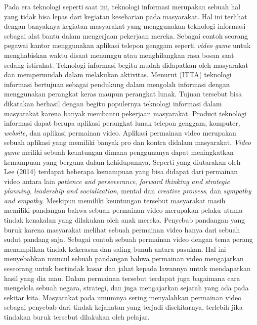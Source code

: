 Pada era teknologi seperti saat ini, teknologi informasi merupakan sebuah hal yang tidak bisa lepas dari kegiatan keseharian pada masyarakat. Hal ini terlihat dengan banyaknya kegiatan masyarakat yang menggunakan teknologi informasi sebagai alat bantu dalam mengerjaan pekerjaan mereka. Sebagai contoh seorang pegawai kantor menggunakan aplikasi telepon genggam seperti \textit{video game} untuk menghabiskan waktu disaat menunggu atau menghilangkan rasa bosan saat sedang istirahat.
\linebreak
\linebreak
Teknologi informasi begitu mudah didapatkan oleh masyarakat dan mempermudah dalam melakukan aktivitas. Menurut \ITTA (ITTA) teknologi informasi bertujuan sebagai pendukung dalam mengolah informasi dengan menggunakan perangkat keras maupun perangkat lunak. Tujuan tersebut bisa dikatakan berhasil dengan begitu populernya teknologi informasi dalam masyarakat karena banyak membantu pekerjaan masyarakat.
\linebreak\linebreak
Product teknologi informasi dapat berupa aplikasi perangkat lunak telepon genggam, komputer, \textit{website}, dan aplikasi permainan video. Aplikasi permainan video merupakan sebuah aplikasi yang memiliki banyak pro dan kontra didalam masyarakat. \textit{Video game} meiliki sebuah keuntungan dimana penggunanya dapat meningkatkan kemampuan yang berguna dalam kehidupannya. Seperti yang diutarakan oleh Lee (2014) terdapat beberapa kemampuan yang bisa didapat dari permainan video antara lain \textit{patience and perseverance}, \textit{forward thinking and strategic planning}, \textit{leadership and socialization}, mental dan \textit{creative prowess}, dan \textit{sympathy and empathy}. Meskipun memiliki keuntungan tersebut masyarakat masih memiliki pandangan bahwa sebuah permainan video merupakan pelaku utama tindak kenakalan yang dilakukan oleh anak mereka.
\linebreak\linebreak
Penyebab pandangan yang buruk karena masyarakat melihat sebuah permainan video hanya dari sebuah sudut pandang saja. Sebagai contoh sebuah permainan video dengan tema perang menampilkan tindak kekerasan dan saling bunuh antara pasukan. Hal ini menyebabkan muncul sebuah pandangan bahwa permainan video mengajarkan seseorang untuk bertindak kasar dan jahat kepada lawannya untuk mendapatkan hasil yang dia mau. Dalam permainan tersebut terdapat juga bagaimana cara mengelola sebuah negara, strategi, dan juga mengajarkan sejarah yang ada pada sekitar kita. Masyarakat pada umumnya sering menyalahkan permainan video sebagai penyebab dari tindak kejahatan yang terjadi disekitarnya, terlebih jika tindakan buruk tersebut dilakukan oleh pelajar.
